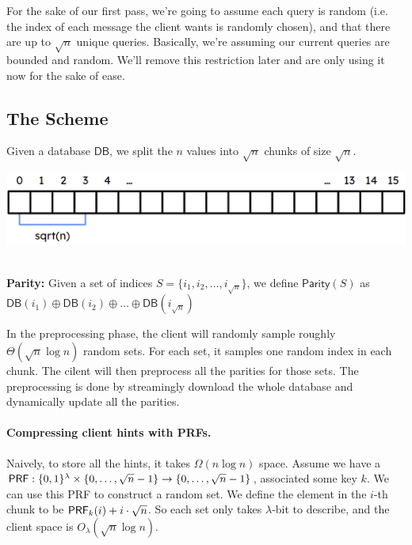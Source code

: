 For the sake of our first pass, we're going to assume each query is random (i.e. the index of each message the client wants is randomly chosen), and that there are up to $\sqrt{n}$ unique queries. Basically, we're assuming our current queries are bounded and random. We'll remove this restriction later and are only using it now for the sake of ease.

\subsection{The Scheme}
Given a database $\mathsf{DB}$, we split the $n$ values into $\sqrt{n}$ chunks of size $\sqrt{n}$.

\begin{center}
    \includegraphics[scale=0.64]{scribingimage.png}
\end{center}

\begin{definition}[]
    \hfill \\
    \textbf{Parity:} Given a set of indices $S = \{i_1, i_2, \dots, i_{\sqrt{n}}\}$, we define $\mathsf{Parity}(S)$ as \hfill \\ $\mathsf{DB}(i_1) \oplus \mathsf{DB}(i_2) \oplus \dots \oplus \mathsf{DB}(i_{\sqrt{n}})$
\end{definition}

In the preprocessing phase,
the client will randomly sample roughly $\Theta(\sqrt{n}\log n)$ random sets.
For each set, it samples one random index in each chunk.
The cilent will then preprocess all the  parities for those sets.
The preprocessing is done by streamingly download the whole database and dynamically update all the parities.

\paragraph{Compressing client hints with PRFs.}
Naively, to store all the hints, it takes $\Omega(n\log n)$ space.
Assume we have a ${\sf PRF}:\{0,1\}^\lambda\times \{0,\dots,\sqrt{n}-1\}\to \{0,\dots,\sqrt{n}-1\}$, associated some key $k$.
We can use this PRF to construct a random set.
We define the element in the $i$-th chunk to be ${\sf PRF}_k(i)+i\cdot\sqrt{n}$.
So each set only takes $\lambda$-bit to describe, and the client space is $O_\lambda(\sqrt{n}\log n)$.

